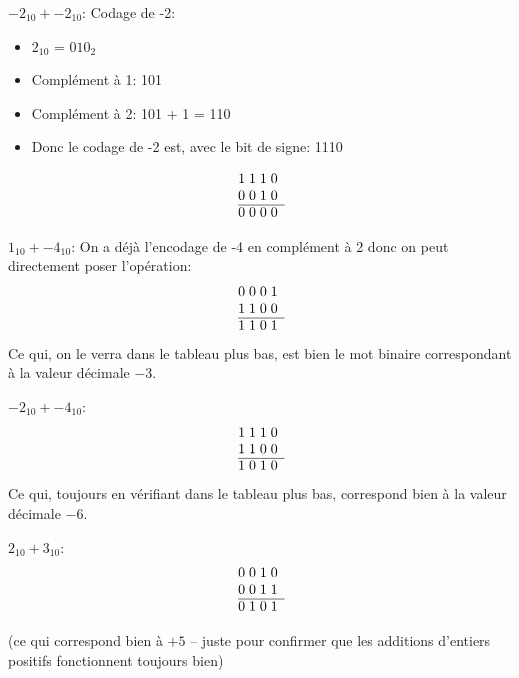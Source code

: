 \documentclass[12pt]{article}
\begin{document}
\begin{MaReponse}
\begin{alphenum}
			\item $-2_{10} + -2_{10}$: Codage de -2:
			\begin{itemize}
				\item $2_{10}$ = $010_2$
				\item Complément à 1: 101
				\item Complément à 2: 101 + 1 = 110
				\item Donc le codage de -2 est, avec le bit de signe: 1110
			\end{itemize}
			\[
			\begin{array}{@{}r *{4}{@{\;}c}}
				& 1 & 1 & 1 & 0 \\
				& 0 & 0 & 1 & 0  \\
				\cline{2-5}
				& 0 & 0 & 0 & 0 \\
			\end{array}
			\]
			\item $1_{10} + -4_{10}$: On a déjà l'encodage de -4 en complément à 2 donc on peut directement poser l'opération:
			\[
			\begin{array}{@{}r *{4}{@{\;}c}}
				& 0 & 0 & 0 & 1 \\
				& 1 & 1 & 0 & 0  \\
				\cline{2-5}
				& 1 & 1 & 0 & 1 \\
			\end{array}
			\]
			Ce qui, on le verra dans le tableau plus bas, est bien le mot binaire correspondant à la valeur décimale $-3$.
			\item $-2_{10} + -4_{10}$:
			\[
			\begin{array}{@{}r *{4}{@{\;}c}}
				& 1 & 1 & 1 & 0 \\
				& 1 & 1 & 0 & 0  \\
				\cline{2-5}
				& 1 & 0 & 1 & 0 \\
			\end{array}
			\]
			Ce qui, toujours en vérifiant dans le tableau plus bas, correspond bien à la valeur décimale $-6$.
			\item $2_{10} + 3_{10}$:
			\[
			\begin{array}{@{}r *{4}{@{\;}c}}
				& 0 & 0 & 1 & 0 \\
				& 0 & 0 & 1 & 1  \\
				\cline{2-5}
				& 0 & 1 & 0 & 1 \\
			\end{array}
			\]
			
		(ce qui correspond bien à $+5$ -- juste pour confirmer que les additions d'entiers positifs fonctionnent toujours bien)
		

\end{alphenum}
\end{MaReponse}
\end{document}
